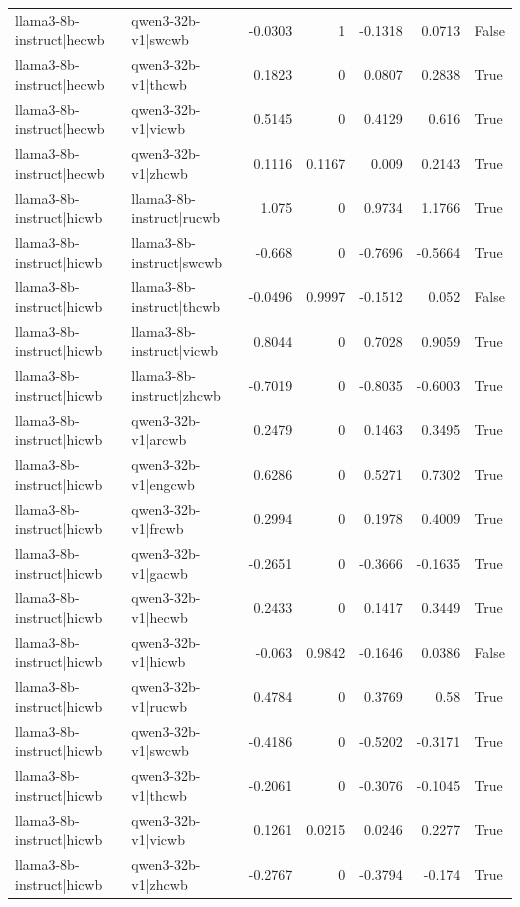 \begin{table}
\begin{tabular}{l l r r r r l}
llama3-8b-instruct|hecwb & qwen3-32b-v1|swcwb & -0.0303 & 1 & -0.1318 & 0.0713 & False \\
llama3-8b-instruct|hecwb & qwen3-32b-v1|thcwb & 0.1823 & 0 & 0.0807 & 0.2838 & True \\
llama3-8b-instruct|hecwb & qwen3-32b-v1|vicwb & 0.5145 & 0 & 0.4129 & 0.616 & True \\
llama3-8b-instruct|hecwb & qwen3-32b-v1|zhcwb & 0.1116 & 0.1167 & 0.009 & 0.2143 & True \\
llama3-8b-instruct|hicwb & llama3-8b-instruct|rucwb & 1.075 & 0 & 0.9734 & 1.1766 & True \\
llama3-8b-instruct|hicwb & llama3-8b-instruct|swcwb & -0.668 & 0 & -0.7696 & -0.5664 & True \\
llama3-8b-instruct|hicwb & llama3-8b-instruct|thcwb & -0.0496 & 0.9997 & -0.1512 & 0.052 & False \\
llama3-8b-instruct|hicwb & llama3-8b-instruct|vicwb & 0.8044 & 0 & 0.7028 & 0.9059 & True \\
llama3-8b-instruct|hicwb & llama3-8b-instruct|zhcwb & -0.7019 & 0 & -0.8035 & -0.6003 & True \\
llama3-8b-instruct|hicwb & qwen3-32b-v1|arcwb & 0.2479 & 0 & 0.1463 & 0.3495 & True \\
llama3-8b-instruct|hicwb & qwen3-32b-v1|engcwb & 0.6286 & 0 & 0.5271 & 0.7302 & True \\
llama3-8b-instruct|hicwb & qwen3-32b-v1|frcwb & 0.2994 & 0 & 0.1978 & 0.4009 & True \\
llama3-8b-instruct|hicwb & qwen3-32b-v1|gacwb & -0.2651 & 0 & -0.3666 & -0.1635 & True \\
llama3-8b-instruct|hicwb & qwen3-32b-v1|hecwb & 0.2433 & 0 & 0.1417 & 0.3449 & True \\
llama3-8b-instruct|hicwb & qwen3-32b-v1|hicwb & -0.063 & 0.9842 & -0.1646 & 0.0386 & False \\
llama3-8b-instruct|hicwb & qwen3-32b-v1|rucwb & 0.4784 & 0 & 0.3769 & 0.58 & True \\
llama3-8b-instruct|hicwb & qwen3-32b-v1|swcwb & -0.4186 & 0 & -0.5202 & -0.3171 & True \\
llama3-8b-instruct|hicwb & qwen3-32b-v1|thcwb & -0.2061 & 0 & -0.3076 & -0.1045 & True \\
llama3-8b-instruct|hicwb & qwen3-32b-v1|vicwb & 0.1261 & 0.0215 & 0.0246 & 0.2277 & True \\
llama3-8b-instruct|hicwb & qwen3-32b-v1|zhcwb & -0.2767 & 0 & -0.3794 & -0.174 & True \\

\end{tabular}
\end{table}
